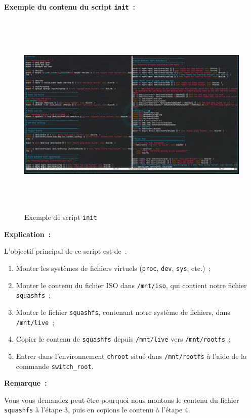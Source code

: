 \vspace{0.5cm}
\noindent
\textbf{Exemple du contenu du script \texttt{init} :}
\begin{figure}[H]
  \centering
  \includegraphics[width=1\textwidth, height=10cm]{images_pfe/intirdinitscript.png}
  \caption{Exemple de script \texttt{init}}
  \label{fig:initscript}
\end{figure}

\vspace{0.3cm}
\noindent
\textbf{Explication :}

L’objectif principal de ce script est de :
\begin{enumerate}
  \item Monter les systèmes de fichiers virtuels (\texttt{proc}, \texttt{dev}, \texttt{sys}, etc.) ;
  \item Monter le contenu du fichier ISO dans \texttt{/mnt/iso}, qui contient notre fichier \texttt{squashfs} ;
  \item Monter le fichier \texttt{squashfs}, contenant notre système de fichiers, dans \texttt{/mnt/live} ;
  \item Copier le contenu de \texttt{squashfs} depuis \texttt{/mnt/live} vers \texttt{/mnt/rootfs} ;
  \item Entrer dans l’environnement \texttt{chroot} situé dans \texttt{/mnt/rootfs} à l’aide de la commande \texttt{switch\_root}.
\end{enumerate}

\vspace{0.5cm}
\noindent
\textbf{Remarque :}

Vous vous demandez peut-être pourquoi nous montons le contenu du fichier \texttt{squashfs} à l’étape 3, puis en copions le contenu à l’étape 4.

